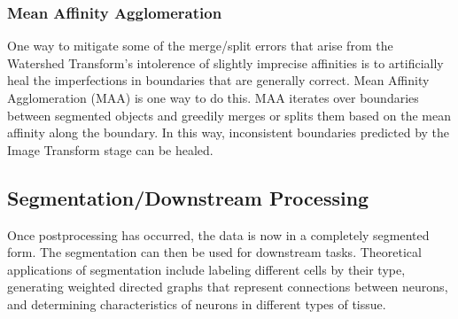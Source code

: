 \subsubsection{Mean Affinity Agglomeration}
One way to mitigate some of the merge/split errors that arise from the Watershed Transform's intolerence of slightly imprecise affinities is to artificially heal the imperfections in boundaries that are generally correct. Mean Affinity Agglomeration (MAA) is one way to do this. MAA iterates over boundaries between segmented objects and greedily merges or splits them based on the mean affinity along the boundary. In this way, inconsistent boundaries predicted by the Image Transform stage can be healed.

\subsection{Segmentation/Downstream Processing}
Once postprocessing has occurred, the data is now in a completely segmented form. The segmentation can then be used for downstream tasks. Theoretical applications of segmentation include labeling different cells by their type, generating weighted directed graphs that represent connections between neurons, and determining characteristics of neurons in different types of tissue.
